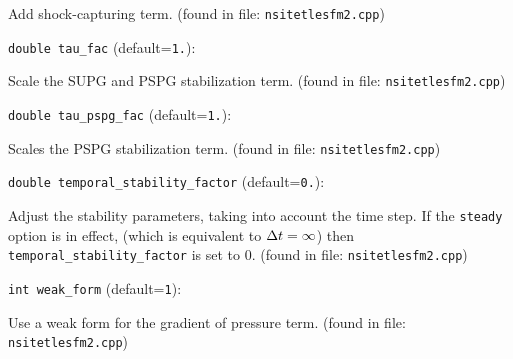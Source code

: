 Add shock-capturing term.
 (found in file: \verb+nsitetlesfm2.cpp+)
\item\verb+double tau_fac+ {\rm(default=\verb|1.|)}:

Scale the SUPG and PSPG stabilization term. 
 (found in file: \verb+nsitetlesfm2.cpp+)
\item\verb+double tau_pspg_fac+ {\rm(default=\verb|1.|)}:

Scales the PSPG stabilization term. 
 (found in file: \verb+nsitetlesfm2.cpp+)
\item\verb+double temporal_stability_factor+ {\rm(default=\verb|0.|)}:

Adjust the stability parameters, taking into account
the time step. If the  \verb+steady+  option is in effect,
(which is equivalent to ${\Delta t}=\infty$) then
 \verb+temporal_stability_factor+  is set to 0.
 (found in file: \verb+nsitetlesfm2.cpp+)
\item\verb+int weak_form+ {\rm(default=\verb|1|)}:

Use a weak form for the gradient of pressure term.
 (found in file: \verb+nsitetlesfm2.cpp+)
